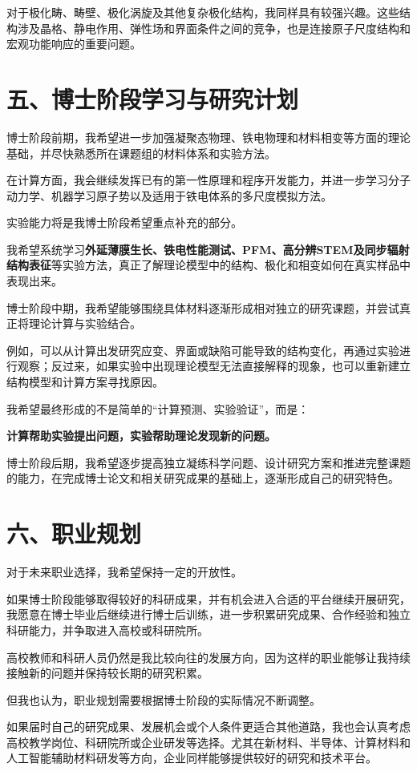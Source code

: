 对于极化畴、畴壁、极化涡旋及其他复杂极化结构，我同样具有较强兴趣。这些结构涉及晶格、静电作用、弹性场和界面条件之间的竞争，也是连接原子尺度结构和宏观功能响应的重要问题。

\section{五、博士阶段学习与研究计划}

博士阶段前期，我希望进一步加强凝聚态物理、铁电物理和材料相变等方面的理论基础，并尽快熟悉所在课题组的材料体系和实验方法。

在计算方面，我会继续发挥已有的第一性原理和程序开发能力，并进一步学习分子动力学、机器学习原子势以及适用于铁电体系的多尺度模拟方法。

实验能力将是我博士阶段希望重点补充的部分。

我希望系统学习\textbf{外延薄膜生长、铁电性能测试、PFM、高分辨STEM及同步辐射结构表征}等实验方法，真正了解理论模型中的结构、极化和相变如何在真实样品中表现出来。

博士阶段中期，我希望能够围绕具体材料逐渐形成相对独立的研究课题，并尝试真正将理论计算与实验结合。

例如，可以从计算出发研究应变、界面或缺陷可能导致的结构变化，再通过实验进行观察；反过来，如果实验中出现理论模型无法直接解释的现象，也可以重新建立结构模型和计算方案寻找原因。

我希望最终形成的不是简单的“计算预测、实验验证”，而是：

\textbf{计算帮助实验提出问题，实验帮助理论发现新的问题。}

博士阶段后期，我希望逐步提高独立凝练科学问题、设计研究方案和推进完整课题的能力，在完成博士论文和相关研究成果的基础上，逐渐形成自己的研究特色。

\section{六、职业规划}

对于未来职业选择，我希望保持一定的开放性。

如果博士阶段能够取得较好的科研成果，并有机会进入合适的平台继续开展研究，我愿意在博士毕业后继续进行博士后训练，进一步积累研究成果、合作经验和独立科研能力，并争取进入高校或科研院所。

高校教师和科研人员仍然是我比较向往的发展方向，因为这样的职业能够让我持续接触新的问题并保持较长期的研究积累。

但我也认为，职业规划需要根据博士阶段的实际情况不断调整。

如果届时自己的研究成果、发展机会或个人条件更适合其他道路，我也会认真考虑高校教学岗位、科研院所或企业研发等选择。尤其在新材料、半导体、计算材料和人工智能辅助材料研发等方向，企业同样能够提供较好的研究和技术平台。

